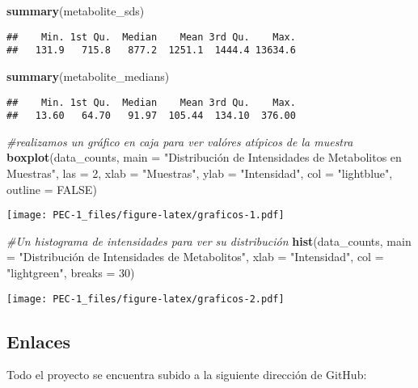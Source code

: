 \documentclass[
]{article}
\newenvironment{Shaded}{\begin{snugshade}}{\end{snugshade}}
\newcommand{\AttributeTok}[1]{\textcolor[rgb]{0.13,0.29,0.53}{#1}}
\newcommand{\CommentTok}[1]{\textcolor[rgb]{0.56,0.35,0.01}{\textit{#1}}}
\newcommand{\ConstantTok}[1]{\textcolor[rgb]{0.56,0.35,0.01}{#1}}
\newcommand{\DecValTok}[1]{\textcolor[rgb]{0.00,0.00,0.81}{#1}}
\newcommand{\FunctionTok}[1]{\textcolor[rgb]{0.13,0.29,0.53}{\textbf{#1}}}
\newcommand{\NormalTok}[1]{#1}
\newcommand{\StringTok}[1]{\textcolor[rgb]{0.31,0.60,0.02}{#1}}
\begin{document}
\begin{Shaded}
\begin{Highlighting}[]
\FunctionTok{summary}\NormalTok{(metabolite\_sds)}
\end{Highlighting}
\end{Shaded}

\begin{verbatim}
##    Min. 1st Qu.  Median    Mean 3rd Qu.    Max. 
##   131.9   715.8   877.2  1251.1  1444.4 13634.6
\end{verbatim}

\begin{Shaded}
\begin{Highlighting}[]
\FunctionTok{summary}\NormalTok{(metabolite\_medians)}
\end{Highlighting}
\end{Shaded}

\begin{verbatim}
##    Min. 1st Qu.  Median    Mean 3rd Qu.    Max. 
##   13.60   64.70   91.97  105.44  134.10  376.00
\end{verbatim}

\begin{Shaded}
\begin{Highlighting}[]
\CommentTok{\#realizamos un gráfico en caja para ver valóres atípicos de la muestra}
\FunctionTok{boxplot}\NormalTok{(data\_counts, }\AttributeTok{main =} \StringTok{"Distribución de Intensidades de Metabolitos en Muestras"}\NormalTok{, }\AttributeTok{las =} \DecValTok{2}\NormalTok{,}
        \AttributeTok{xlab =} \StringTok{"Muestras"}\NormalTok{, }\AttributeTok{ylab =} \StringTok{"Intensidad"}\NormalTok{, }\AttributeTok{col =} \StringTok{"lightblue"}\NormalTok{, }\AttributeTok{outline =} \ConstantTok{FALSE}\NormalTok{)}
\end{Highlighting}
\end{Shaded}

\texttt{[image: PEC-1\_files/figure-latex/graficos-1.pdf]}

\begin{Shaded}
\begin{Highlighting}[]
\CommentTok{\#Un histograma de intensidades para ver su distribución}
\FunctionTok{hist}\NormalTok{(data\_counts, }\AttributeTok{main =} \StringTok{"Distribución de Intensidades de Metabolitos"}\NormalTok{,}
     \AttributeTok{xlab =} \StringTok{"Intensidad"}\NormalTok{, }\AttributeTok{col =} \StringTok{"lightgreen"}\NormalTok{, }\AttributeTok{breaks =} \DecValTok{30}\NormalTok{)}
\end{Highlighting}
\end{Shaded}

\texttt{[image: PEC-1\_files/figure-latex/graficos-2.pdf]}

\subsection{Enlaces}\label{enlaces}

Todo el proyecto se encuentra subido a la siguiente dirección de GitHub:
\end{document}
